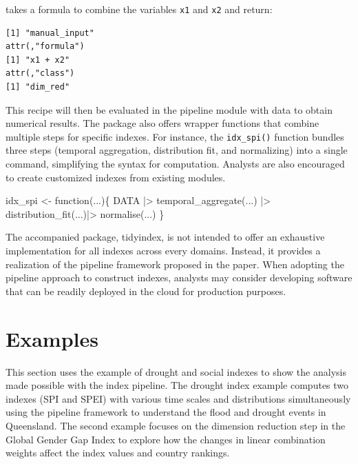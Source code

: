 \documentclass[
]{interact}
\newenvironment{Shaded}{\begin{snugshade}}{\end{snugshade}}
\newcommand{\ControlFlowTok}[1]{\textcolor[rgb]{0.00,0.23,0.31}{#1}}
\newcommand{\FunctionTok}[1]{\textcolor[rgb]{0.28,0.35,0.67}{#1}}
\newcommand{\NormalTok}[1]{\textcolor[rgb]{0.00,0.23,0.31}{#1}}
\newcommand{\OtherTok}[1]{\textcolor[rgb]{0.00,0.23,0.31}{#1}}
\newcommand{\SpecialCharTok}[1]{\textcolor[rgb]{0.37,0.37,0.37}{#1}}
\begin{document}
takes a formula to combine the variables \texttt{x1} and \texttt{x2} and
return:

\begin{verbatim}
[1] "manual_input"
attr(,"formula")
[1] "x1 + x2"
attr(,"class")
[1] "dim_red"
\end{verbatim}

This recipe will then be evaluated in the pipeline module with data to
obtain numerical results. The package also offers wrapper functions that
combine multiple steps for specific indexes. For instance, the
\texttt{idx\_spi()} function bundles three steps (temporal aggregation,
distribution fit, and normalizing) into a single command, simplifying
the syntax for computation. Analysts are also encouraged to create
customized indexes from existing modules.

\begin{Shaded}
\begin{Highlighting}[]
\NormalTok{idx\_spi }\OtherTok{\textless{}{-}} \ControlFlowTok{function}\NormalTok{(...)\{}
\NormalTok{  DATA }\SpecialCharTok{|\textgreater{}}
    \FunctionTok{temporal\_aggregate}\NormalTok{(...) }\SpecialCharTok{|\textgreater{}}
    \FunctionTok{distribution\_fit}\NormalTok{(...)}\SpecialCharTok{|\textgreater{}}
    \FunctionTok{normalise}\NormalTok{(...)}
\NormalTok{\}}
\end{Highlighting}
\end{Shaded}

The accompanied package, tidyindex, is not intended to offer an
exhaustive implementation for all indexes across every domains. Instead,
it provides a realization of the pipeline framework proposed in the
paper. When adopting the pipeline approach to construct indexes,
analysts may consider developing software that can be readily deployed
in the cloud for production purposes.

\hypertarget{sec-examples}{%
\section{Examples}\label{sec-examples}}

This section uses the example of drought and social indexes to show the
analysis made possible with the index pipeline. The drought index
example computes two indexes (SPI and SPEI) with various time scales and
distributions simultaneously using the pipeline framework to understand
the flood and drought events in Queensland. The second example focuses
on the dimension reduction step in the Global Gender Gap Index to
explore how the changes in linear combination weights affect the index
values and country rankings.
\end{document}
